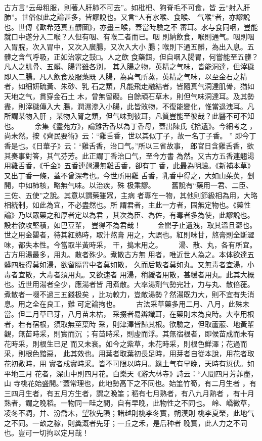 \documentclass{ctexart}
\begin{document}
\paragraph{}
古方言``云母粗服，則著人肝肺不可去''。如枇杷、狗脊毛不可食，皆 云``射入肝肺''。世俗似此之論甚多，皆謬說也。又言``人有水喉、食喉、 气喉''者，亦謬說也。世傳《歐希范真五髒圖》，亦畫三喉，蓋當時驗之不 審耳。水与食同咽，豈能就口中遂分入二喉？人但有咽、有喉二者而已。咽 則納飲食，喉則通气。咽則咽入胃脘，次入胃中，又次入廣腸，又次入大小 腸；喉則下通五髒，為出入息。五髒之含气呼吸，正如治家之鼓□。人之飲 食藥餌，但自咽入腸胃，何嘗能至五髒？凡人之肌骨、五髒、腸胃雖各別， 其入腸之物，英精之气味，皆能洞達，但滓穢即入二腸。凡人飲食及服藥既 入腸，為真气所蒸，英精之气味，以至金石之精者，如細妍硫黃、朱砂、乳 石之類，凡能飛走融結者，皆隨真气洞達肌骨，猶如天地之气，貫穿金石土 木，曾無留礙。自餘頑石草木，則但气味洞達耳。及其勢盡，則滓穢傳入大 腸，潤濕滲入小腸，此皆敗物，不復能變化，惟當退洩耳。凡所謂某物入肝 ，某物入腎之類，但气味到彼耳，凡質豈能至彼哉？此醫不可不知也。 　　余集《靈苑方》，論雞舌香以為丁香母，蓋出陳氏《拾遺》。今細考之 ，尚未然。按《齊民要術》云：``雞舌香，世以其似丁子，故一名丁子香。 '' 即今丁香是也。《日華子》云：``雞舌香，治口气。''所以三省故事， 郎官日含雞舌香，欲其奏事對答，其气芬芳。此正謂丁香治口气，至今方書 為然。又古方五香連翹湯用雞舌香，《千金》五香連翹湯無雞舌香，卻有丁 香，此最為明驗。《新補本草》又出丁香一條，蓋不曾深考也。今世所用雞 舌香，乳香中得之，大如山茱萸，剉開，中如柿核，略無气味。以治疾，殊 极乘謬。 　　舊說有``藥用一君、二臣、三佐、五使''之說。其意以謂藥雖眾，主病 者專在一物，其他則節級相為用，大略相統制，如此為宜，不必盡然也。所 謂君者，主此一方者，固無定物也。《藥性論》乃以眾藥之和厚者定以為君 ，其次為臣、為佐，有毒者多為使，此謬說也。設若欲攻堅積，如巴豆輩， 豈得不為君哉！ 　　金罌子止遺洩，取其溫且澀也。世之用金罌者，待其紅熟時，取汁熬膏 用之，大誤也。紅則味甘，熬膏則全斷澀味，都失本性。今當取半黃時采， 干，搗末用之。 　　湯、散、丸，各有所宜。古方用湯最多，用丸、散者殊少。煮散古方無 用者，唯近世人為之。本体欲達五髒四肢得莫如湯，欲留膈胃中者莫如散， 久而后散者莫如丸。又無毒者宜湯，小毒者宜散，大毒者須用丸。又欲速者 用湯，稍緩者用散，甚緩者用丸。此其大概也。近世用湯者全少，應湯者皆 用煮散。大率湯劑气勢完壯，力与丸、散倍蓰。煮散者一啜不過三五錢极矣 ，比功較力，豈敵湯勢？然湯既力大，則不宜有失消息。用之全在良工，難 可定論拘也。 　　古法采草藥多用二月、八月，此殊未當。但二月草已芽，八月苗未枯， 采掇者易辯識耳，在藥則未為良時。大率用根者，若有宿根，須取無莖葉時 采，則津澤皆歸其根。欲驗之，但取蘆菔、地黃輩觀，無苗時采，則實而沉 ；有苗時采，則虛而浮。其無宿根者，即候苗成而未有花時采，則根生已足 而又未衰。如今之紫草，未花時采，則根色鮮澤；花過而采，則根色黯惡， 此其效也。用葉者取葉初長足時，用芽者自從本說，用花者取花初敷時，用 實者成實時采。皆不可限以時月。緣土气有早晚，天時有愆伏。如平地三月 花者，深山中則四月花。白樂天《游大林寺》詩云：``人間四月芳菲盡，山 寺桃花始盛開。''蓋常理也，此地勢高下之不同也。始筀竹筍，有二月生者 ，有三四月生者，有五月方生者，謂之晚筀；稻有七月熟者，有八九月熟者 ，有十月熟者，謂之晚稻。一物同一畦之間，自有早晚，此物性之不同也。 岭、嶠微草，凌冬不凋，并、汾喬木，望秋先隕；諸越則桃李冬實，朔漠則 桃李夏榮，此地气之不同。一畝之稼，則糞溉者先牙；一丘之禾，是后种者 晚實，此人力之不同也。豈可一切拘以定月哉！ 
\end{document}
